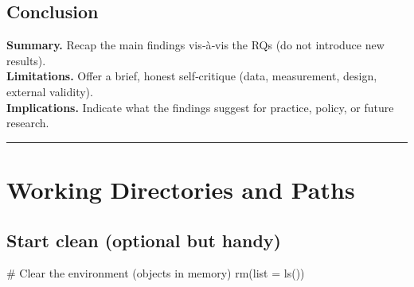 \documentclass[
  letterpaper,
  DIV=11,
  numbers=noendperiod]{scrreprt}
\newenvironment{Shaded}{\begin{snugshade}}{\end{snugshade}}
\newcommand{\AttributeTok}[1]{\textcolor[rgb]{0.40,0.45,0.13}{#1}}
\newcommand{\CommentTok}[1]{\textcolor[rgb]{0.37,0.37,0.37}{#1}}
\newcommand{\FunctionTok}[1]{\textcolor[rgb]{0.28,0.35,0.67}{#1}}
\newcommand{\NormalTok}[1]{\textcolor[rgb]{0.00,0.23,0.31}{#1}}
\begin{document}
\section*{Conclusion}\label{conclusion}


\textbf{Summary.} Recap the main findings vis‑à‑vis the RQs (do not
introduce new results).\\
\textbf{Limitations.} Offer a brief, honest self‑critique (data,
measurement, design, external validity).\\
\textbf{Implications.} Indicate what the findings suggest for practice,
policy, or future research.

\begin{center}\rule{0.5\linewidth}{0.5pt}\end{center}

\section*{}\label{section}

\markright{}


\chapter*{Working Directories and
Paths}\label{working-directories-and-paths}


\section*{Start clean (optional but
handy)}\label{start-clean-optional-but-handy}


\begin{Shaded}
\begin{Highlighting}[]
\CommentTok{\# Clear the environment (objects in memory)}
\FunctionTok{rm}\NormalTok{(}\AttributeTok{list =} \FunctionTok{ls}\NormalTok{())}
\end{Highlighting}
\end{Shaded}
\end{document}
